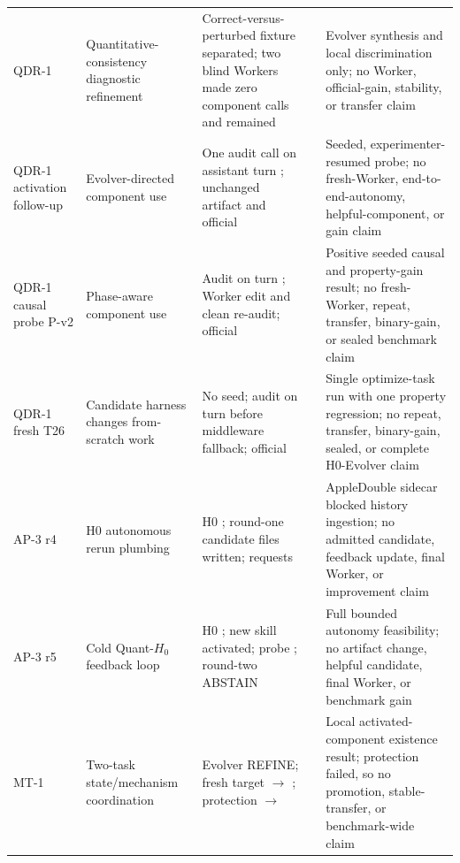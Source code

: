 \begin{table}[t]
\begin{tabular}{p{}p{}p{}p{}p{}}
QDR-1 & Quantitative-consistency diagnostic refinement & Correct-versus-
perturbed fixture separated; two blind Workers made zero component calls and
remained \QDROneScore{} & \QDROneStatus{} & Evolver synthesis and local
discrimination only; no Worker, official-gain, stability, or transfer claim \\

QDR-1 activation follow-up & Evolver-directed component use & One audit call on
assistant turn \QDRActivationFirstTurn{}; unchanged artifact and official
\QDRActivationScore{} & \QDRActivationStatus{} & Seeded, experimenter-resumed
probe; no fresh-Worker, end-to-end-autonomy, helpful-component, or gain claim \\

QDR-1 causal probe P-v2 & Phase-aware component use & Audit on turn
\QDRCausalProbeFirstTurn{}; Worker edit and clean re-audit; official
\QDRCausalProbeScore{} & \QDRCausalProbeStatus{} & Positive seeded causal and
property-gain result; no fresh-Worker, repeat, transfer, binary-gain, or sealed
benchmark claim \\

QDR-1 fresh T26 & Candidate harness changes from-scratch work & No seed; audit
on turn \QDRFreshFirstTurn{} before middleware fallback; official
\QDRFreshScore{} & \QDRFreshStatus{} & Single optimize-task run with one
property regression; no repeat, transfer, binary-gain, sealed, or complete
H0-Evolver claim \\

AP-3 r4 & H0 autonomous rerun plumbing & H0 \APThreeRfourHZero{}; round-one
candidate files written; \APThreeRfourRequests{} requests &
\APThreeRfourStatus{} & AppleDouble sidecar blocked history ingestion; no
admitted candidate, feedback update, final Worker, or improvement claim \\

AP-3 r5 & Cold Quant-$H_0$ feedback loop & H0
\APThreeRfiveHZero{}; new skill activated; probe \APThreeRfiveProbe{}; round-two
ABSTAIN & \APThreeRfiveStatus{} & Full bounded autonomy feasibility; no
artifact change, helpful candidate, final Worker, or benchmark gain \\

MT-1 & Two-task state/mechanism coordination & Evolver REFINE; fresh target
\MTOneTargetComparator{} $\rightarrow$ \MTOneTargetCandidate{}; protection
\MTOneProtectionComparator{} $\rightarrow$ \MTOneProtectionCandidate{} &
\MTOneStatus{} & Local activated-component existence result; protection failed,
so no promotion, stable-transfer, or benchmark-wide claim \\


\end{tabular}
\end{table}
